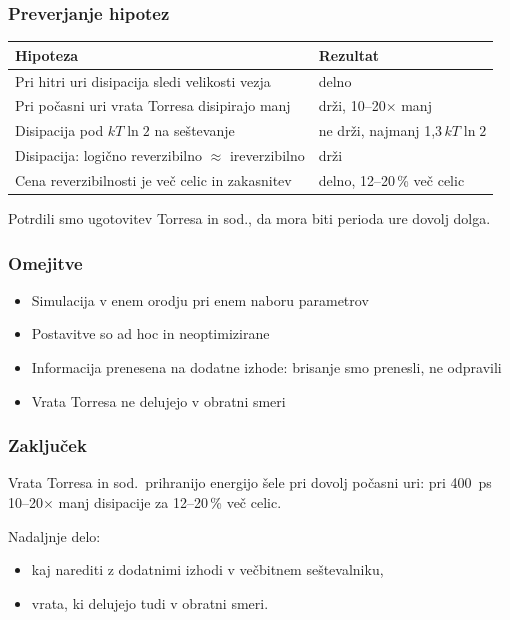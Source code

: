 \documentclass{beamer}
\begin{document}
\begin{frame}
\frametitle{Preverjanje hipotez}

\centering
\small
\renewcommand{\arraystretch}{1.3}
\begin{tabular}{l l}
\toprule
Hipoteza & Rezultat \\
\midrule
Pri hitri uri disipacija sledi velikosti vezja & delno \\
Pri počasni uri vrata Torresa disipirajo manj & drži, 10--20$\times$ manj \\
Disipacija pod $kT\ln 2$ na seštevanje & ne drži, najmanj 1,3\,$kT\ln 2$ \\
Disipacija: logično reverzibilno $\approx$ ireverzibilno & drži \\
Cena reverzibilnosti je več celic in zakasnitev & delno, 12--20\,\% več celic \\
\bottomrule
\end{tabular}

\vspace{1em}
Potrdili smo ugotovitev Torresa in sod., da mora biti perioda ure dovolj dolga.

\end{frame}

\begin{frame}
\frametitle{Omejitve}

\begin{itemize}
\item Simulacija v enem orodju pri enem naboru parametrov
\item Postavitve so ad hoc in neoptimizirane
\item Informacija prenesena na dodatne izhode: brisanje smo prenesli, ne odpravili
\item Vrata Torresa ne delujejo v obratni smeri
\end{itemize}

\end{frame}

\begin{frame}
\frametitle{Zaključek}

Vrata Torresa in sod.\ prihranijo energijo šele pri dovolj počasni uri: pri \SI{400}{\pico\second} 10--20$\times$ manj disipacije za 12--20\,\% več celic.

\vspace{1.5em}
Nadaljnje delo:
\begin{itemize}
\item kaj narediti z dodatnimi izhodi v večbitnem seštevalniku,
\item vrata, ki delujejo tudi v obratni smeri.
\end{itemize}

\end{frame}
\end{document}
